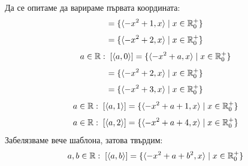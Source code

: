 \begin{example}
    Да се опитаме да варираме първата координата:
    \begin{equation}
        [\langle 1, 0 \rangle] = \{ \langle -x^2 + 1, x \rangle \mid x \in \R_0^+\}
    \end{equation}
    \begin{equation}
        [\langle 2, 0 \rangle] = \{ \langle -x^2 + 2, x \rangle \mid x \in \R_0^+\}
    \end{equation}
    \begin{equation}
        a\in {\mathbb{R}}:\; [\langle a, 0 \rangle] = \{ \langle -x^2 + a, x \rangle \mid x \in {\mathbb{R}}_0^+\}
    \end{equation}
    \begin{equation}
        [\langle 1, 1 \rangle] = \{ \langle -x^2 + 2, x \rangle \mid x \in \R_0^+\}
    \end{equation}
    \begin{equation}
        [\langle 2, 1 \rangle] = \{ \langle -x^2 + 3, x \rangle \mid x \in \R_0^+\}
    \end{equation}
    \begin{equation}
        a \in {\mathbb{R}}:\; [\langle a, 1 \rangle] = \{ \langle -x^2 + a + 1, x \rangle \mid x \in {\mathbb{R}}_0^+\}
    \end{equation}
    \begin{equation}
        a \in {\mathbb{R}}:\; [\langle a, 2 \rangle] = \{ \langle -x^2 + a + 4, x \rangle \mid x \in {\mathbb{R}}_0^+\}
    \end{equation}
    Забелязваме вече шаблона, затова твърдим:
    \begin{equation}
        a, b \in {\mathbb{R}}:\; [\langle a, b \rangle] = \{ \langle -x^2 + a + b^2, x \rangle \mid x \in {\mathbb{R}}_0^+\}
    \end{equation}
\end{example}